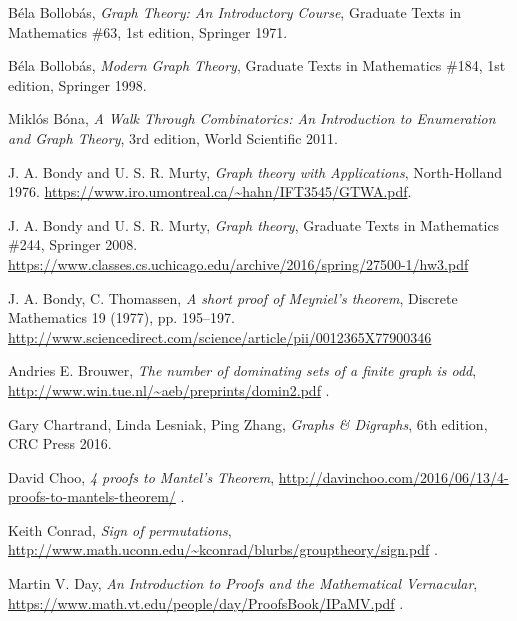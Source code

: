 \documentclass[numbers=enddot,12pt,final,onecolumn,notitlepage]{scrartcl}%
\theoremstyle{definition}
\begin{document}
\begin{thebibliography}{9999999999}
B\'ela Bollob\'as,
\textit{Graph Theory: An Introductory Course},
Graduate Texts in Mathematics \#63, 1st edition, Springer 1971.

B\'ela Bollob\'as,
\textit{Modern Graph Theory},
Graduate Texts in Mathematics \#184, 1st edition, Springer 1998.

Mikl\'os B\'ona,
\textit{A Walk Through Combinatorics:
An Introduction to Enumeration and Graph Theory},
3rd edition, World Scientific 2011.

J. A. Bondy and U. S. R. Murty, \textit{Graph theory with Applications},
North-Holland 1976.
\newline \url{https://www.iro.umontreal.ca/~hahn/IFT3545/GTWA.pdf}.

J. A. Bondy and U. S. R. Murty, \textit{Graph theory}, Graduate Texts
in Mathematics \#244, Springer 2008.
\newline \url{https://www.classes.cs.uchicago.edu/archive/2016/spring/27500-1/hw3.pdf}

J. A. Bondy, C. Thomassen,
\textit{A short proof of Meyniel's theorem},
Discrete Mathematics 19 (1977), pp. 195--197.
\newline \url{http://www.sciencedirect.com/science/article/pii/0012365X77900346}

Andries E. Brouwer,
\textit{The number of dominating sets of a finite graph is odd},
\url{http://www.win.tue.nl/~aeb/preprints/domin2.pdf} .


Gary Chartrand, Linda Lesniak, Ping Zhang,
\textit{Graphs \& Digraphs}, 6th edition, CRC Press 2016.

David Choo,
\textit{4 proofs to Mantel's Theorem},
\url{http://davinchoo.com/2016/06/13/4-proofs-to-mantels-theorem/} .

Keith Conrad, \textit{Sign of permutations},
\newline\url{http://www.math.uconn.edu/~kconrad/blurbs/grouptheory/sign.pdf} .

Martin V. Day,
\textit{An Introduction to Proofs and the Mathematical Vernacular},
\newline\url{https://www.math.vt.edu/people/day/ProofsBook/IPaMV.pdf} .


\end{thebibliography}
\end{document}
